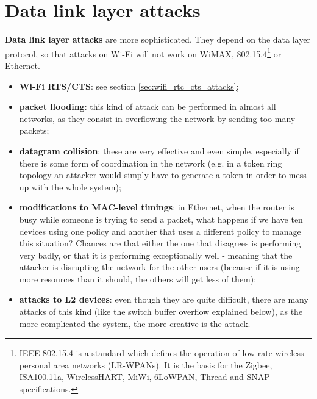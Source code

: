 \vspace{0.5em}


\section{Data link layer attacks}
\textbf{Data link layer attacks} are more sophisticated. They depend on the data layer protocol, so that attacks on Wi-Fi will not work on WiMAX, 802.15.4\footnote{IEEE 802.15.4 is a standard which defines the operation of low-rate wireless personal area networks (LR-WPANs). It is the basis for the Zigbee, ISA100.11a, WirelessHART, MiWi, 6LoWPAN, Thread and SNAP specifications.} or Ethernet.

\begin{itemize}
	\item \textbf{Wi-Fi RTS/CTS}: see section \ref{sec:wifi_rtc_cts_attacks};
	\item \textbf{packet flooding}: this kind of attack can be performed in almost all networks, as they consist in overflowing the network by sending too many packets;
	\item \textbf{datagram collision}: these are very effective and even simple, especially if there is some form of coordination in the network (e.g. in a token ring topology an attacker would simply have to generate a token in order to mess up with the whole system);
	\item \textbf{modifications to MAC-level timings}: in Ethernet, when the router is busy while someone is trying to send a packet, what happens if we have ten devices using one policy and another that uses a different policy to manage this situation? Chances are that either the one that disagrees is performing very badly, or that it is performing exceptionally well - meaning that the attacker is disrupting the network for the other users (because if it is using more resources than it should, the others will get less of them);
	\item \textbf{attacks to L2 devices}: even though they are quite difficult, there are many attacks of this kind (like the switch buffer overflow explained below), as the more complicated the system, the more creative is the attack.
	\begin{itemize}

\end{itemize}
\end{itemize}
